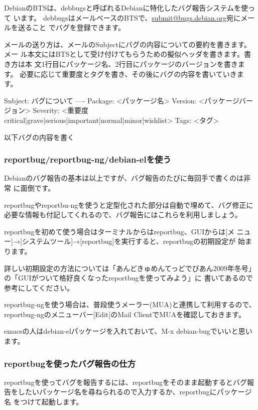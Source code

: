 \documentclass[mingoth,a4paper]{jsarticle}
\begin{document}
DebianのBTSは、debbugsと呼ばれるDebianに特化したバグ報告システムを使って
います。
debbugsはメールベースのBTSで、\url{submit@bugs.debian.org}宛にメールを送ること
でバグを登録できます。

メールの送り方は、メールのSubjectにバグの内容についての要約を書きます。メー
ル本文にはBTSとして受け付けてもらうための擬似ヘッダを書きます。書き方は本
文1行目にパッケージ名、2行目にパッケージのバージョンを書きます。
必要に応じて重要度とタグを書き、その後にバグの内容を書いていきます。

\begin{commandline}
Subject: バグについて
----
Package: <パッケージ名>
Version: <パッケージバージョン>
Severity: <重要度 critical|grave|serious|important|normal|minor|wishlist>
Tags: <タグ>

以下バグの内容を書く
\end{commandline}

\subsubsection{reportbug/reportbug-ng/debian-elを使う}

Debianのバグ報告の基本は以上ですが、バグ報告のたびに毎回手で書くのは非常
に面倒です。

reportbugやreportbu-ngを使うと定型化された部分は自動で埋めて、バグ修正に
必要な情報も付記してくれるので、バグ報告にはこれらを利用しましょう。

reportbugを初めて使う場合はターミナルからはreportbug、GUIからは[メ
ニュー]→[システムツール]→[reportbug]を実行すると、reportbugの初期設定が
始まります。

詳しい初期設定の方法については「あんどきゅめんてっどでびあん2009年冬号」
の「GUIがついて格好良くなったreportbugを使ってみよう」\cite{nogata2009}に
書いてあるので参考にしてください。

reportbug-ngを使う場合は、普段使うメーラー(MUA)と連携して利用するので、
reportbug-ngのメニューバー[Edit]のMail ClientでMUAを確認しておきます。

emacsの人はdebian-elパッケージを入れておいて、M-x debian-bugでいいと思い
ます。

\subsubsection{reportbugを使ったバグ報告の仕方}

reportbugを使ってバグを報告するには、reportbugをそのまま起動するとバグ報
告をしたいパッケージ名を尋ねられるので入力するか、reportbugにパッケージ名
をつけて起動します。
\end{document}
